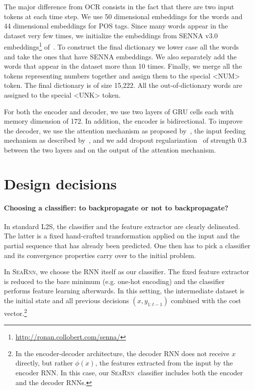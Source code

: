 \documentclass{article}
\newcommand{\SEARNN}{\textsc{SeaRnn}}
\begin{document}
	The major difference from OCR consists in the fact that there are two input tokens at each time step.
	We use 50 dimensional embeddings for the words and 44 dimensional embeddings for POS tags.
	Since many words appear in the dataset very few times, we initialize the embeddings from
	SENNA v3.0 embeddings\footnote{\url{http://ronan.collobert.com/senna/}} of~\citet{collobert2011natural}.
	To construct the final dictionary we lower case all the words and take the ones that have SENNA embeddings.
	We also separately add the words that appear in the dataset more than 10 times.
	Finally, we merge all the tokens representing numbers together and assign them to the special <NUM> token.
	The final dictionary is of size 15,222.
	All the out-of-dictionary words are assigned to the special <UNK> token.

	For both the encoder and decoder, we use two layers of GRU cells each with memory dimension of 172.
	In addition, the encoder is bidirectional.
	To improve the decoder, we use the attention mechanism as proposed by~\citet{Bahdanau2015,Bahdanau2016}, the input feeding mechanism as described by~\citet[Section~3.3]{Luong15}, and we add dropout regularization~\citep{srivastava2014dropout} of strength 0.3 between the two layers and on the output of the attention mechanism.

	\section{Design decisions}\label{apx:design}
	\paragraph{Choosing a classifier: to backpropagate or not to backpropagate?}
	In standard L2S, the classifier and the feature extractor are clearly delineated. 
	The latter is a fixed hand-crafted transformation applied on the input and the partial sequence that has already been predicted.
	One then has to pick a classifier and its convergence properties carry over to the initial problem.
	
	In \SEARNN, we choose the RNN itself as our classifier.
	The fixed feature extractor is reduced to the bare minimum (e.g. one-hot encoding) and the classifier performs feature learning afterwards.
	In this setting, the intermediate dataset is the initial state and all previous decisions $(x, y_{1:t-1})$ combined with the cost vector.\footnote{In the encoder-decoder architecture, the decoder RNN does not receive $x$ directly, but rather $\phi(x)$, the features extracted from the input by the encoder RNN. In this case, our \SEARNN\ classifier includes both the encoder and the decoder RNNs.}
	
\end{document}
